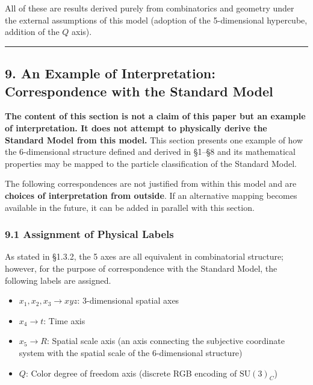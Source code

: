 \documentclass[
  a4paper,11pt]{article}
\providecommand{\tightlist}{%
  \setlength{\itemsep}{0pt}\setlength{\parskip}{0pt}}
\theoremstyle{definition}
\theoremstyle{remark}
\begin{document}
All of these are results derived purely from combinatorics and geometry
under the external assumptions of this model (adoption of the
5-dimensional hypercube, addition of the \(Q\) axis).

\begin{center}\rule{0.5\linewidth}{0.5pt}\end{center}

\subsection{9. An Example of Interpretation: Correspondence with the
Standard
Model}\label{an-example-of-interpretation-correspondence-with-the-standard-model}

\textbf{The content of this section is not a claim of this paper but an
example of interpretation. It does not attempt to physically derive the
Standard Model from this model.} This section presents one example of
how the 6-dimensional structure defined and derived in §1--§8 and its
mathematical properties may be mapped to the particle classification of
the Standard Model.

The following correspondences are not justified from within this model
and are \textbf{choices of interpretation from outside}. If an
alternative mapping becomes available in the future, it can be added in
parallel with this section.

\subsubsection{9.1 Assignment of Physical
Labels}\label{assignment-of-physical-labels}

As stated in §1.3.2, the 5 axes are all equivalent in combinatorial
structure; however, for the purpose of correspondence with the Standard
Model, the following labels are assigned.

\begin{itemize}
\tightlist
\item
  \(x_1, x_2, x_3 \to xyz\): 3-dimensional spatial axes
\item
  \(x_4 \to t\): Time axis
\item
  \(x_5 \to R\): Spatial scale axis (an axis connecting the subjective
  coordinate system with the spatial scale of the 6-dimensional
  structure)
\item
  \(Q\): Color degree of freedom axis (discrete RGB encoding of
  \(\mathrm{SU}(3)_C\))
\end{itemize}
\end{document}
